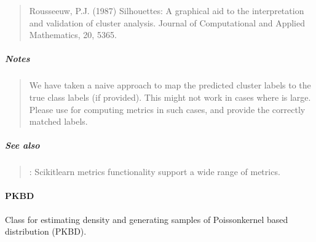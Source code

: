 \documentclass[letterpaper,10pt,english,openany,oneside]{sphinxmanual}
\begin{document}
{{{{\begin{fulllineitems}
\begin{quote}
\sphinxAtStartPar
Rousseeuw, P.J. (1987) Silhouettes: A graphical aid to the interpretation and validation of cluster analysis.
Journal of Computational and Applied Mathematics, 20, 53\textendash{}65.
\end{quote}


\subparagraph{Notes}
\label{\detokenize{api_reference/generated/QuadratiK.spherical_clustering.PKBC:notes}}\begin{quote}

\sphinxAtStartPar
We have taken a naive approach to map the predicted cluster labels
to the true class labels (if provided). This might not work in cases where  is large.
Please use  for computing metrics in such cases, and provide the correctly
matched labels.
\end{quote}


\subparagraph{See also}
\label{\detokenize{api_reference/generated/QuadratiK.spherical_clustering.PKBC:see-also}}\begin{quote}

\sphinxAtStartPar
{} : Scikit\sphinxhyphen{}learn metrics functionality support a wide range of metrics.
\end{quote}

\end{fulllineitems}




\sphinxstepscope


\paragraph{PKBD}
\label{\detokenize{api_reference/generated/QuadratiK.spherical_clustering.PKBD:pkbd}}\label{\detokenize{api_reference/generated/QuadratiK.spherical_clustering.PKBD::doc}}

\begin{fulllineitems}
\label{\detokenize{api_reference/generated/QuadratiK.spherical_clustering.PKBD:QuadratiK.spherical_clustering.PKBD}}
\pysigstartsignatures
{}
\pysigstopsignatures
\sphinxAtStartPar
Class for estimating density and generating samples of Poisson\sphinxhyphen{}kernel based distribution (PKBD).


\end{fulllineitems}}}}}
\end{document}
